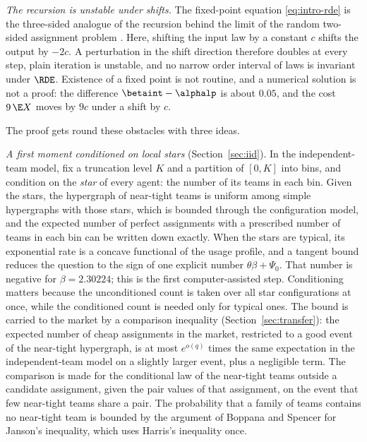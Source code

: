 \emph{The recursion is unstable under shifts.} The fixed-point equation \eqref{eq:intro-rde}
is the three-sided analogue of the recursion behind the limit of the random two-sided
assignment problem \cite{Aldous01}. Here, shifting the input law by a constant $c$ shifts
the output by $-2c$. A perturbation in the shift direction therefore doubles at every step,
plain iteration is unstable, and no narrow order interval of laws is invariant under $\RDE$.
Existence of a fixed point is not routine, and a numerical solution is not a proof: the
difference $\betaint-\alphalp$ is about $0.05$, and the cost $9\,\E X$ moves by $9c$ under a
shift by $c$.

The proof gets round these obstacles with three ideas.

\emph{A first moment conditioned on local stars} (Section~\ref{sec:iid}). In the
independent-team model, fix a truncation level $K$ and a partition of $[0,K]$ into bins, and
condition on the \emph{star} of every agent: the number of its teams in each bin. Given the
stars, the hypergraph of near-tight teams is uniform among simple hypergraphs with those
stars, which is bounded through the configuration model, and the expected number of
perfect assignments with a prescribed number of teams in each bin can be written down
exactly. When the stars are typical, its exponential rate is a concave functional of the usage
profile, and a tangent bound reduces the question to the sign of one explicit number
$\theta\beta+\Psi_0$. That number is negative for $\beta=2.30224$; this is the first
computer-assisted step. Conditioning matters because the unconditioned count is taken over all
star configurations at once, while the conditioned count is needed only for typical ones. The
bound is carried to the market by a comparison inequality (Section~\ref{sec:transfer}): the
expected number of cheap assignments in the market, restricted to a good event of the
near-tight hypergraph, is at most $e^{o(q)}$ times the same expectation in the
independent-team model on a slightly larger event, plus a negligible term. The comparison is
made for the conditional law of the near-tight teams outside a candidate assignment, given
the pair values of that assignment, on the event that few near-tight teams share a pair. The probability that a family of teams
contains no near-tight team is bounded by the argument of Boppana and Spencer
\cite{BoppanaSpencer89} for Janson's inequality, which uses Harris's inequality
\cite{Harris60} once.


